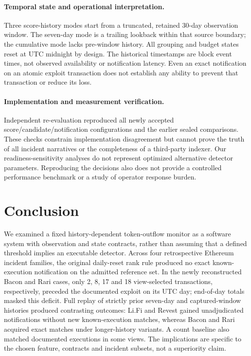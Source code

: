 \documentclass[preprint,12pt,authoryear]{elsarticle}
\begin{document}
\paragraph{Temporal state and operational interpretation.} Three score-history modes start from a truncated, retained 30-day observation window. The seven-day mode is a trailing lookback within that source boundary; the cumulative mode lacks pre-window history. All grouping and budget states reset at UTC midnight by design. The historical timestamps are block event times, not observed availability or notification latency. Even an exact notification on an atomic exploit transaction does not establish any ability to prevent that transaction or reduce its loss.

\paragraph{Implementation and measurement verification.} Independent re-evaluation reproduced all newly accepted score/candidate/notification configurations and the earlier sealed comparisons. These checks constrain implementation disagreement but cannot prove the truth of all incident narratives or the completeness of a third-party indexer. Our readiness-sensitivity analyses do not represent optimized alternative detector parameters. Reproducing the decisions also does not provide a controlled performance benchmark or a study of operator response burden.

\section{Conclusion}\label{sec:conclusion}

We examined a fixed history-dependent token-outflow monitor as a software system with observation and state contracts, rather than assuming that a defined threshold implies an executable detector. Across four retrospective Ethereum incident families, the original daily-reset rank rule produced no exact known-execution notification on the admitted reference set. In the newly reconstructed Bacon and Rari cases, only 2, 8, 17 and 18 view-selected transactions, respectively, preceded the documented exploit on its UTC day; end-of-day totals masked this deficit. Full replay of strictly prior seven-day and captured-window histories produced contrasting outcomes: Li.Fi and Revest gained unadjudicated notifications without new known-execution matches, whereas Bacon and Rari acquired exact matches under longer-history variants. A count baseline also matched documented executions in some views. The implications are specific to the chosen feature, contracts and incident subsets, not a superiority claim.
\end{document}
